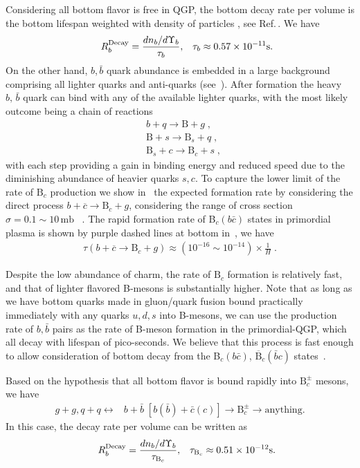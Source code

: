 Considering all bottom flavor is free in QGP, the bottom decay rate per volume is the bottom lifespan weighted with density of particles , see Ref.\,\cite{Kuznetsova:2008jt}. We have
\begin{align}\hspace{0.5cm}
R^{\mathrm{Decay}}_b=\frac{dn_b/d\Upsilon_b}{\tau_b},\,\,\,\,\, \tau_b\approx0.57\times10^{-11} \mathrm{s}.
\end{align}
On the other hand, $b$,\,$\bar b$ quark abundance is embedded in a large background comprising all lighter quarks and anti-quarks (see~). After formation the heavy $b,\,\bar b$ quark can bind with any of the available lighter quarks, with the most likely outcome being a chain of reactions 
\begin{align}
&b+q\longrightarrow\mathrm{B}+g\;,\\
&\mathrm{B}+s\longrightarrow\mathrm{B}_s+q\;,\\
&\mathrm{B}_s+c\longrightarrow\mathrm{B}_c+s\;,
\end{align}
with each step providing a gain in binding energy and reduced speed due to the diminishing abundance of heavier quarks $s, c$. To capture the lower limit of the rate of $\mathrm{B}_c$ production we show in~ the expected formation rate by considering the direct process $b+\overline c\rightarrow \mathrm{B}_c+g$, considering the range of cross section $\sigma=0.1\sim10\,\mathrm{mb}$ ~\cite{Schroedter:2000ek}. The rapid formation rate of B$_c(b\bar c)$ states in primordial plasma is shown by purple dashed lines at bottom in~, we have
\begin{align}
\tau (b+\overline c\rightarrow \mathrm{B}_c+g)\approx(10^{-16}\sim10^{-14})\times\frac{1}{H} \;.
\end{align}

Despite the low abundance of charm, the rate of $\mathrm{B}_c$ formation is relatively fast, and that of lighter flavored B-mesons is substantially higher. Note that as long as we have bottom quarks made in gluon/quark fusion bound practically immediately with any quarks $u, d, s$ into B-mesons, we can use the production rate of $b, \bar b$ pairs as the rate of B-meson formation in the primordial-QGP, which all decay with lifespan of pico-seconds. We believe that this process is fast enough to allow consideration of bottom decay from the B$_c(b\bar c)$, $\overline{\mathrm{B}}_c(\bar b c)$ states~\cite{Yang:2020nne}. 
 
Based on the hypothesis that all bottom flavor is bound rapidly into $\mathrm{B}_c^\pm$ mesons, we have 
\begin{align}\label{Bc_source}
g+g, q+q \longleftrightarrow &b+\bar b\;[b(\bar{b})+\bar{c}(c)]\longrightarrow \mathrm{B}_c^\pm\longrightarrow\mathrm{anything}.
\end{align}
In this case, the decay rate per volume can be written as
\begin{align}\hspace{0.5cm}
 R^{\mathrm{Decay}}_b=\frac{dn_b/d\Upsilon_b}{\tau_{\mathrm{B}_c}},\,\,\,\,\, \tau_{\mathrm{B}_c}\approx0.51\times10^{-12} \mathrm{s}.
 \end{align}

